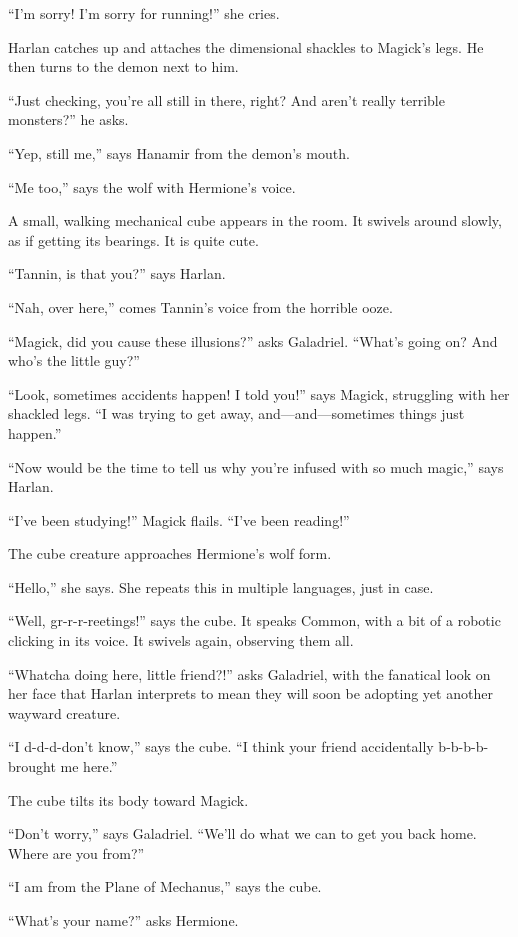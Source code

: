 \documentclass[smalldemyvopaper,11pt,twoside,onecolumn,openright,extrafontsizes]{memoir}
\begin{document}
``I'm sorry! I'm sorry for running!'' she cries.

Harlan catches up and attaches the dimensional shackles to Magick's
legs. He then turns to the demon next to him.

``Just checking, you're all still in there, right? And aren't really
terrible monsters?'' he asks.

``Yep, still me,'' says Hanamir from the demon's mouth.

``Me too,'' says the wolf with Hermione's voice.

A small, walking mechanical cube appears in the room. It swivels around
slowly, as if getting its bearings. It is quite cute.

``Tannin, is that you?'' says Harlan.

``Nah, over here,'' comes Tannin's voice from the horrible ooze.

``Magick, did you cause these illusions?'' asks Galadriel. ``What's
going on? And who's the little guy?''

``Look, sometimes accidents happen! I told you!'' says Magick,
struggling with her shackled legs. ``I was trying to get away,
and---and---sometimes things just happen.''

``Now would be the time to tell us why you're infused with so much
magic,'' says Harlan.

``I've been studying!'' Magick flails. ``I've been reading!''

The cube creature approaches Hermione's wolf form.

``Hello,'' she says. She repeats this in multiple languages, just in
case.

``Well, gr-r-r-reetings!'' says the cube. It speaks Common, with a bit
of a robotic clicking in its voice. It swivels again, observing them
all.

``Whatcha doing here, little friend?!'' asks Galadriel, with the
fanatical look on her face that Harlan interprets to mean they will soon
be adopting yet another wayward creature.

``I d-d-d-don't know,'' says the cube. ``I think your friend
accidentally b-b-b-b-brought me here.''

The cube tilts its body toward Magick.

``Don't worry,'' says Galadriel. ``We'll do what we can to get you back
home. Where are you from?''

``I am from the Plane of Mechanus,'' says the cube.

``What's your name?'' asks Hermione.
\end{document}
